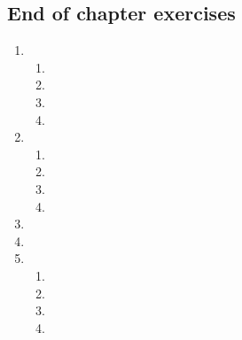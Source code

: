 
\subsection{End of chapter exercises} %

\begin{enumerate}[itemsep=5pt, label=\textbf{\arabic*}. ] 
\item%
    \begin{enumerate}[itemsep=5pt, label=\textbf{(\alph*)} ] 
    \item %
    \item %
    \item %
    \item %
    \end{enumerate}
\item %
    \begin{enumerate}[itemsep=5pt, label=\textbf{(\alph*)} ] 
    \item %
    \item %
    \item %
    \item %
    \end{enumerate}
\item %
\item %


\item %
    \begin{enumerate}[itemsep=5pt, label=\textbf{(\alph*)} ]  
    \item %
    \item %
    \item %
    \item %
    \end{enumerate}


\end{enumerate}
